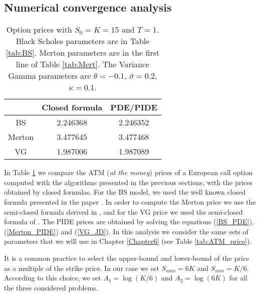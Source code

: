 \subsection{Numerical convergence analysis}\label{numerical_concergence_section}

\begin{table}[ht]
\centering
\begin{tabular}[t]{ccc}
\toprule
       &  \textbf{Closed formula} &  \textbf{PDE/PIDE} \\
\midrule
BS      &  2.246368  & 2.246352 \\
Merton  &  3.477645  & 3.477468 \\ 
VG      &  1.987006  & 1.987089 \\
\bottomrule
\end{tabular}
\caption{Option prices with $S_0=K=15$ and $T=1$. Black Scholes parameters are in Table \ref{tab:BS}. Merton parameters are in the first line of Table \ref{tab:Mert}.
The Variance Gamma parameters are $\theta=-0.1$, $\bar \sigma = 0.2$, $\kappa = 0.1$.}
\label{tab:prices_BS_M_VG}
\end{table}%

In Table \ref{tab:prices_BS_M_VG} we compare the ATM (\emph{at the money}) prices of a European call option computed with the algorithms presented 
in the previous sections, with the prices obtained by closed formulas.
For the BS model, we used the well known closed formula presented in the paper \cite{BS73}. 
In order to compute the Merton price we use the semi-closed formula derived in \cite{Me76},
and for the VG price we used the semi-closed formula of \cite{MCC98}. 
The PIDE prices are obtained by solving the equations (\ref{BS_PDE}), (\ref{Merton_PIDE}) and (\ref{VG_JD}).
In this analysis we consider the same sets of parameters that we will use in Chapter \ref{Chapter6} (see Table \ref{tab:ATM_price}).

It is a common practice to select the upper-bound and lower-bound of the price as a multiple of the strike price. 
In our case we set $S_{max} = 6K$ and $S_{min} = K/6$.
According to this choice, we set $A_1 = \log(K/6)$ and $A_2 = \log(6K)$ for all the three considered problems.
 
